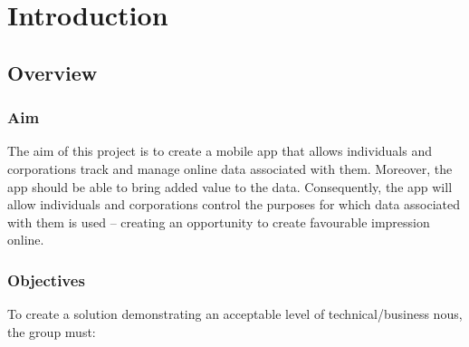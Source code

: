 \section{Introduction}

\subsection{Overview}

\subsubsection{Aim}

The aim of this project is to create a mobile app that allows individuals and corporations track and manage online data associated with them. Moreover, the app should be able to bring added value to the data. Consequently, the app will allow individuals and corporations control the purposes for which data associated with them is used – creating an opportunity to create favourable impression online.

\subsubsection{Objectives}

To create a solution demonstrating an acceptable level of technical/business nous, the group must:

